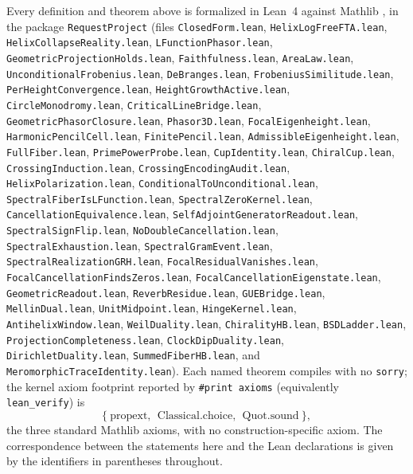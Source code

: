 \documentclass[11pt]{article}
\newcommand{\code}[1]{\texttt{#1}}
\begin{document}
Every definition and theorem above is formalized in Lean~4 \cite{Lean4} against Mathlib
\cite{Mathlib2020}, in the package
\code{RequestProject} (files \code{ClosedForm.lean}, \code{HelixLogFreeFTA.lean},
\code{HelixCollapseReality.lean}, \code{LFunctionPhasor.lean}, \code{GeometricProjectionHolds.lean},
\code{Faithfulness.lean}, \code{AreaLaw.lean}, \code{UnconditionalFrobenius.lean},
\code{DeBranges.lean}, \code{FrobeniusSimilitude.lean}, \code{PerHeightConvergence.lean},
\code{HeightGrowthActive.lean}, \code{CircleMonodromy.lean}, \code{CriticalLineBridge.lean},
\code{GeometricPhasorClosure.lean}, \code{Phasor3D.lean}, \code{FocalEigenheight.lean},
\code{HarmonicPencilCell.lean}, \code{FinitePencil.lean}, \code{AdmissibleEigenheight.lean}, \code{FullFiber.lean},
\code{PrimePowerProbe.lean}, \code{CupIdentity.lean}, \code{ChiralCup.lean},
\code{CrossingInduction.lean}, \code{CrossingEncodingAudit.lean}, \code{HelixPolarization.lean},
\code{ConditionalToUnconditional.lean}, \code{SpectralFiberIsLFunction.lean},
\code{SpectralZeroKernel.lean}, \code{CancellationEquivalence.lean},
\code{SelfAdjointGeneratorReadout.lean}, \code{SpectralSignFlip.lean},
\code{NoDoubleCancellation.lean}, \code{SpectralExhaustion.lean},
\code{SpectralGramEvent.lean}, \code{SpectralRealizationGRH.lean},
\code{FocalResidualVanishes.lean}, \code{FocalCancellationFindsZeros.lean},
\code{FocalCancellationEigenstate.lean}, \code{GeometricReadout.lean},
\code{ReverbResidue.lean}, \code{GUEBridge.lean}, \code{MellinDual.lean},
\code{UnitMidpoint.lean}, \code{HingeKernel.lean}, \code{AntihelixWindow.lean},
\code{WeilDuality.lean}, \code{ChiralityHB.lean}, \code{BSDLadder.lean},
\code{ProjectionCompleteness.lean}, \code{ClockDipDuality.lean},
\code{DirichletDuality.lean}, \code{SummedFiberHB.lean}, and
\code{MeromorphicTraceIdentity.lean}). Each named
theorem compiles with no \code{sorry}; the kernel axiom footprint reported by \code{\#print axioms}
(equivalently \code{lean\_verify}) is
\[
  \{\ \mathrm{propext},\ \ \mathrm{Classical.choice},\ \ \mathrm{Quot.sound}\ \},
\]
the three standard Mathlib axioms, with no construction-specific axiom. The correspondence between
the statements here and the Lean declarations is given by the identifiers in parentheses throughout.
\end{document}
